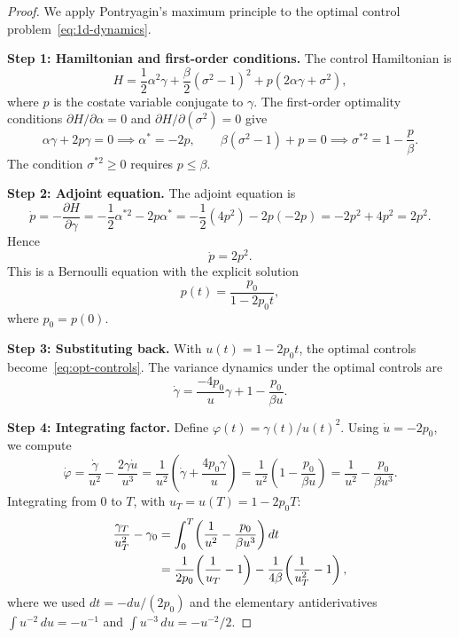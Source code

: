 \documentclass[12pt]{article}
\theoremstyle{definition}
\begin{document}
\begin{proof}
We apply Pontryagin's maximum principle to the optimal control
problem~\eqref{eq:1d-dynamics}.

\medskip\noindent
\textbf{Step 1: Hamiltonian and first-order conditions.}
The control Hamiltonian is
\begin{equation}\label{eq:hamiltonian}
H = \frac{1}{2}\alpha^2 \gamma + \frac{\beta}{2}(\sigma^2 - 1)^2
  + p(2\alpha\gamma + \sigma^2),
\end{equation}
where $p$ is the costate variable conjugate to $\gamma$.
The first-order optimality conditions $\partial H/\partial\alpha = 0$
and $\partial H/\partial(\sigma^2) = 0$ give
\begin{equation}\label{eq:foc}
\alpha\gamma + 2p\gamma = 0 \implies \alpha^* = -2p, \qquad
\beta(\sigma^2 - 1) + p = 0 \implies \sigma^{*2} = 1 - \frac{p}{\beta}.
\end{equation}
The condition $\sigma^{*2} \ge 0$ requires $p \le \beta$.

\medskip\noindent
\textbf{Step 2: Adjoint equation.}
The adjoint equation is
\[
\dot p = -\frac{\partial H}{\partial \gamma}
  = -\frac{1}{2}\alpha^{*2} - 2p\alpha^*
  = -\frac{1}{2}(4p^2) - 2p(-2p)
  = -2p^2 + 4p^2 = 2p^2.
\]
Hence
\begin{equation}\label{eq:adjoint}
\dot p = 2p^2.
\end{equation}
This is a Bernoulli equation with the explicit solution
\begin{equation}\label{eq:p-sol}
p(t) = \frac{p_0}{1 - 2p_0 t},
\end{equation}
where $p_0 = p(0)$.

\medskip\noindent
\textbf{Step 3: Substituting back.}
With $u(t) = 1 - 2p_0 t$, the optimal controls
become~\eqref{eq:opt-controls}.
The variance dynamics under the optimal controls are
\begin{equation}\label{eq:gamma-opt}
\dot\gamma = \frac{-4p_0}{u} \gamma + 1 - \frac{p_0}{\beta u}.
\end{equation}

\medskip\noindent
\textbf{Step 4: Integrating factor.}
Define $\varphi(t) = \gamma(t)/u(t)^2$.
Using $\dot u = -2p_0$, we compute
\[
\dot\varphi = \frac{\dot\gamma}{u^2} - \frac{2\gamma \dot u}{u^3}
  = \frac{1}{u^2}\!\left(\dot\gamma + \frac{4p_0 \gamma}{u}\right)
  = \frac{1}{u^2}\!\left(1 - \frac{p_0}{\beta u}\right)
  = \frac{1}{u^2} - \frac{p_0}{\beta u^3}.
\]
Integrating from $0$ to $T$, with $u_T = u(T) = 1 - 2p_0 T$:
\begin{align}
\frac{\gamma_T}{u_T^2} - \gamma_0
  &= \int_0^T \!\left(\frac{1}{u^2} - \frac{p_0}{\beta u^3}\right) dt
  \notag\\
  &= \frac{1}{2p_0}\!\left(\frac{1}{u_T} - 1\right)
    - \frac{1}{4\beta}\!\left(\frac{1}{u_T^2} - 1\right),
    \label{eq:integrated}
\end{align}
where we used $dt = -du/(2p_0)$ and the elementary antiderivatives
$\int u^{-2}\,du = -u^{-1}$ and $\int u^{-3}\,du = -u^{-2}/2$.


\end{proof}
\end{document}
